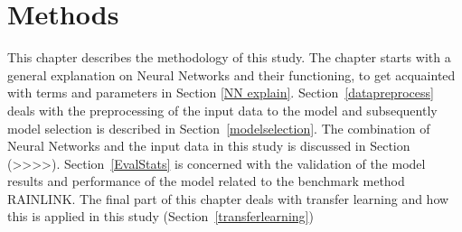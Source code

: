 \documentclass[twocolumn, 10pt, a4paper]{memoir}
\begin{document}
%
%
%
%
%
%
%
%
%
%
%
%
%
%
%
%
%
%
%
%




\chapter{Methods} \label{ch: methods}
This chapter describes the methodology of this study. The chapter starts with a general explanation on Neural Networks and their functioning, to get acquainted with terms and parameters in Section \ref{NN explain}. Section~\ref{datapreprocess} deals with the preprocessing of the input data to the model and subsequently model selection is described in Section~\ref{modelselection}. The combination of Neural Networks and the input data in this study is discussed in Section (>>>>). Section~\ref{EvalStats} is concerned with the validation of the model results and performance of the model related to the benchmark method RAINLINK. The final part of this chapter deals with transfer learning and how this is applied in this study (Section~\ref{transferlearning})
\end{document}
